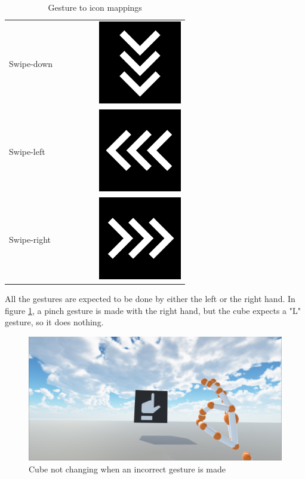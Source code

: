 \documentclass[12pt,a4paper,twoside]{report}
\begin{document}
\begin{table}[h]
\begin{tabular}{ m{0.3\linewidth} m{0.3\linewidth} }
    Swipe-down & \includegraphics[width=0.3\linewidth]{img/swipe-down.png} \\
    Swipe-left & \includegraphics[width=0.3\linewidth]{img/swipe-left.png} \\
    Swipe-right & \includegraphics[width=0.3\linewidth]{img/swipe-right.png} \\    
  \end{tabular}
  \caption{Gesture to icon mappings}
  \label{tab:gestures}
\end{table}

All the gestures are expected to be done by either the left or the right hand. In figure \ref{fig:testing_nochange}, a pinch gesture is made with the right hand, but the cube expects a "L" gesture, so it does nothing.

\begin{figure}[h]
  \centering
  \includegraphics[width=0.9\linewidth]{img/Demo_not_detected.jpg}
  \caption{Cube not changing when an incorrect gesture is made}
  \label{fig:testing_nochange}
\end{figure}
\end{document}
